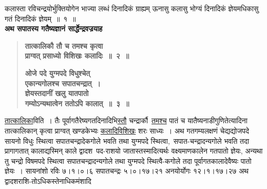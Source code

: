 \documentclass[11pt, openany]{book}
\begin{document}
\begin{sloppypar}
\noindent कलास्ता रविचन्द्रयोर्भुक्तियोगेन भाज्या लब्धं दिनादिकं ग्राह्यम् ऊनासु कलासु भोग्यं दिनादिकं ज्ञेयमधिकासु गतं दिनादिकं ज्ञेयम्~॥~१~॥\\

{\small \textbf{अथ सपातस्य गतैष्यज्ञानं सार्द्धेन्द्रवज्रयाह\textendash }}

 \label{9.2}
\begin{quote}
{\large \textbf{{\color{purple}तात्कालिकौ तौ च तमश्च कृत्वा \\
प्राग्वत् प्रसाध्यो विशिखः कलादिः~॥~२~॥}}
\vspace{1mm}

 \label{9.3}
\textbf{{\color{purple}ओजे पदे युग्मपदे विधुश्चेत् \\
एकान्यगोलश्च सपातचन्द्रात्~। \\
ज्ञेयस्तदानीं खलु यातपातो \\
गम्योऽन्यथात्वेन ततोऽपि कालात्~॥~३~॥}}}
\end{quote}

\hyperref[9.2]{तात्कालिका}विति~। तैः पूर्वागतैरेष्यगतदिनादिभि\hyperref[9.2]{स्तौ} चन्द्रार्कौ~\hyperref[9.2]{तमश्च} पातं च यातैष्यनाडीगुणितेत्यादिना तात्कालिकान् कृत्वा प्राग्वत् खण्डकेभ्यः \hyperref[9.2]{कलादिविशिखः} शरः साध्यः~। अथ गतगम्यलक्षणं चेद्यद्योजपदे सायनो विधुः स्थित्वा सपातचन्द्रादेकगोले भवति तथा युग्मपदे स्थित्वा,~सपात-चन्द्रादन्यगोले भवति तदा प्रागागतात् कालाद्यस्मिन् काले द्वादश~पद-राशयो जातास्तस्मादित्यर्थः वक्ष्यमाणकालेन गतपातो ज्ञेयः, अन्यथा तु चन्द्रो विषमपदे स्थित्वा सपातचन्द्रादन्यगोले तथा युग्मपदे स्थित्वै-कगोले तदा पूर्वागतकालादेवैष्यः पातो ज्ञेयः~। सायनांशो रविः ७।१।०।६ सपातचन्द्रः ५।०।१७।२१ अनयोर्योगः १२।१।१७।२७ अथ द्वादशराशि-तोऽधिकस्तेनाधिकमंशादि
\end{sloppypar}

\newpage
\end{document}
